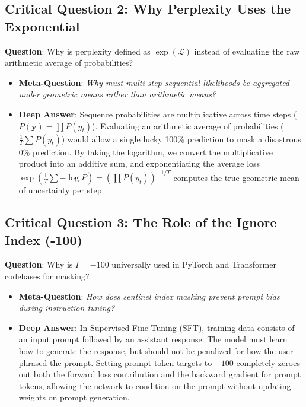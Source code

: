 \documentclass[11pt,a4paper]{article}
\theoremstyle{definition}
\begin{document}
\subsection{\textbf{Critical Question 2: Why Perplexity Uses the Exponential}}
\textbf{Question}: Why is perplexity defined as $\exp(\mathcal{L})$ instead of evaluating the raw arithmetic average of probabilities?
\begin{itemize}
    \item \textbf{Meta-Question}: \emph{Why must multi-step sequential likelihoods be aggregated under geometric means rather than arithmetic means?}
    \item \textbf{Deep Answer}: Sequence probabilities are multiplicative across time steps ($P(\mathbf{y}) = \prod P(y_t)$). Evaluating an arithmetic average of probabilities ($\frac{1}{T}\sum P(y_t)$) would allow a single lucky 100\% prediction to mask a disastrous 0\% prediction. By taking the logarithm, we convert the multiplicative product into an additive sum, and exponentiating the average loss $\exp(\frac{1}{T}\sum -\log P) = (\prod P(y_t))^{-1/T}$ computes the true geometric mean of uncertainty per step.
\end{itemize}

\subsection{\textbf{Critical Question 3: The Role of the Ignore Index (-100)}}
\textbf{Question}: Why is $I = -100$ universally used in PyTorch and Transformer codebases for masking?
\begin{itemize}
    \item \textbf{Meta-Question}: \emph{How does sentinel index masking prevent prompt bias during instruction tuning?}
    \item \textbf{Deep Answer}: In Supervised Fine-Tuning (SFT), training data consists of an input prompt followed by an assistant response. The model must learn how to generate the response, but should not be penalized for how the user phrased the prompt. Setting prompt token targets to $-100$ completely zeroes out both the forward loss contribution and the backward gradient for prompt tokens, allowing the network to condition on the prompt without updating weights on prompt generation.
\end{itemize}
\end{document}
